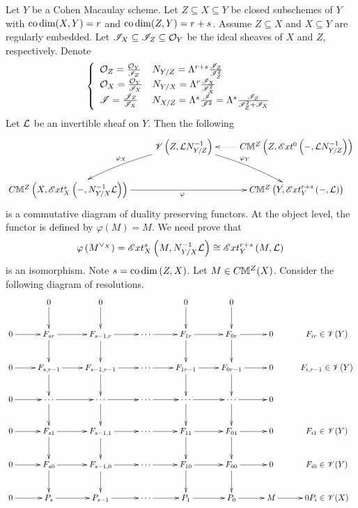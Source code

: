 \documentclass[12pt]{article}
\begin{document}
\bC\label{subsech} %
{\rm 
Let $Y$ be a Cohen Macaulay scheme. Let   $Z\subseteq X\subseteq Y$ be  closed subschemes of $Y$ with 
$\codim(X, Y)=r$ and $\codim(Z, Y)=r+s$.  Assume      $Z\subseteq X$ and $X\subseteq Y$ are regularly embedded. Let ${\SI}_X\subseteq {\SI}_Z\subseteq {\CO}_Y$ be the ideal sheaves of $X$ and $Z$, respectively.
Denote
$$
\LBrace{{ll}
{\CO}_Z= \frac{{\CO}_Y}{{\SI}_Z} &N_{Y/Z}=\Lambda^{r+s}\frac{{\SI}_Z}{{\SI}_Z^2} \\
{\CO}_X= \frac{{\CO}_Y}{{\SI}_X} &N_{Y/X}=\Lambda^r\frac{{\SI}_X}{{\SI}_X^2} \\
{\SI}=\frac{{\SJ}_Z}{{\SI}_X} &N_{X/Z}=\Lambda^s\frac{{\SI}}{{\SI}^2}=\Lambda^s\frac{{\SI}_Z}{{\SI}_Z^2+{\SI}_X} \\
}
$$
Let ${\CL}$ be an invertible sheaf on $Y$.
Then the following  %
$$
\diagram 
& {\SV}\LRf{Z, {\CL}N_{Y/Z}^{-1}}\ar@/^/[dr]^{\varphi_Y} \ar@/_/[dl]_{\varphi_X} &C{\BM}^Z\LRf{Z, {\SE}xt^0\LRf{-, {\CL}N_{Y/Z}^{-1}}} \ar@{..>}[l]\\
C{\BM}^Z\LRf{X, {\SE}xt^s_X\LRf{-, N_{Y/X}^{-1}{\CL}}} \ar[rr]_{\varphi}
&& C{\BM}^{Z}\LRf{Y, {\SE}xt^{r+s}_Y\LRf{-, {\CL}}} \\
\enddiagram 
$$
is a commutative diagram of duality preserving functors. 
}
\eC
\pf At the object level, the functor is defined by $\varphi(M)=M$.  We need prove that
\begin{equation}\label{toPrkl}
\varphi\LRf{M^{\vee_X}}={\SE}xt^s_X\LRf{M, N_{Y/X}^{-1}{\CL}}\cong {\SE}xt^{r+s}_Y\LRf{M, {\CL}}\\
\end{equation}
is an isomorphism. 
Note $s=\codim\LRf{Z, X}$. Let $M\in C{\BM}^Z(X)$. Consider the following diagram of resolutions.
$$
\diagram 
& 0 \ar[d] &0 \ar[d]  &  & 0 \ar[d] &0\ar[d] &  &  \\
0 \ar[r] & F_{sr} \ar[r]\ar[d] & F_{s-1,r} \ar[r]\ar[d]  & \cdots \ar[r] & F_{1r} \ar[r] \ar[d] & F_{0r} \ar[r] \ar[d] & 0 &  F_{ir}\in {\SV}(Y)\\
0 \ar[r] & F_{s,r-1} \ar[r]\ar[d] & F_{s-1,r-1} \ar[r]\ar[d]  & \cdots \ar[r] & F_{1r-1} \ar[r] \ar[d] & F_{0r-1} \ar[r] \ar[d] & 0 &  F_{i, r-1}\in {\SV}(Y)\\
0\ar[r]& \cdots \ar[d] \ar[r]&  \cdots \ar[r]\ar[d]  & \cdots \ar[r] &  \cdots \ar[r] \ar[d] &  \cdots\ar[r] \ar[d] & 0  & \\
0 \ar[r] & F_{s1} \ar[r]\ar[d] & F_{s-1,1} \ar[r]\ar[d]  & \cdots \ar[r] & F_{11} \ar[r] \ar[d] & F_{01} \ar[r] \ar[d] & 0  & F_{i1}\in {\SV}(Y)\\
0 \ar[r] & F_{s0} \ar[r]\ar[d] & F_{s-1,0} \ar[r]\ar[d]  & \cdots \ar[r] & F_{10} \ar[r] \ar[d] & F_{00} \ar[r] \ar[d] & 0  & F_{i0}\in {\SV}(Y)\\
0 \ar[r] & P_s \ar[r] & P_{s-1} \ar[r] & \cdots \ar[r] & P_1 \ar[r] & P_0 \ar[r] & M \ar[r] &0  P_i\in {\SV}(X)\\
\enddiagram 
$$ 
\end{document}
